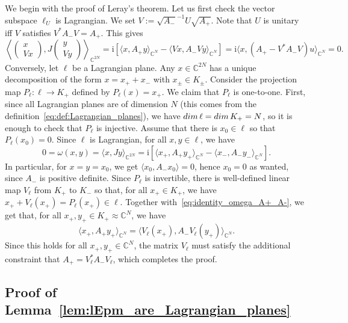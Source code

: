 \documentclass[11pt]{amsart}
\numberwithin{equation}{section} %
\newcommand\1{{\mathds 1}}
\def\C{{\mathbb C}}
\def\ri{{\mathrm{i}}}
\def\bra{\langle}
\def\ket{\rangle}
\def\dim{{\rm dim }}
\begin{document}
We begin with the proof of Leray's theorem. Let us first check the vector subspace $\ell_U$ is Lagrangian. We set $V := \sqrt{ A_-}^{-1} U \sqrt{A_+}$. Note that $U$ is unitary iff $V$ satisfies $V^* A_- V =  A_+$. This gives
    \[
    \left\bra \begin{pmatrix}
        x \\ V x
    \end{pmatrix}, J \begin{pmatrix}
        y \\ V y
    \end{pmatrix} \right\ket_{\C^{2N}} = \ri \left[ \bra x, A_+ y \ket_{\C^N} - \bra Vx, A_- Vy \ket_{\C^N} \right]
    = \ri \bra x, (A_+ - V^* A_- V) u \ket_{\C^N} = 0.
    \]
    Conversely, let $\ell$ be a Lagrangian plane. Any $x \in \C^{2N}$ has a unique decomposition of the form $x = x_+ + x_-$ with $x_\pm \in K_\pm$. Consider the projection map $P_\ell : \ell \to K_+$ defined by $P_\ell(x) = x_+$. We claim that $P_\ell$ is one-to-one. First, since all Lagrangian planes are of dimension $N$ (this comes from the definition~\eqref{eq:def:Lagrangian_planes}), we have $\dim \, \ell = \dim \, K_+ = N$, so it is enough to check that $P_\ell$ is injective. Assume that there is $x_0 \in \ell$ so that $P_\ell(x_0) = 0$. Since $\ell$ is Lagrangian, for all $x, y \in \ell$, we have
    \begin{equation} \label{eq:identity_omega_A+_A-}
        0 = \omega(x, y) = \bra x, J y \ket_{\C^{2N}} = \ri \left[ \bra x_+, A_+ y_+ \ket_{\C^N} - \bra x_-, A_- y_- \ket_{\C^N} \right].
    \end{equation}
    In particular, for $x = y = x_0$, we get $\bra x_0, A_- x_0 \ket = 0$, hence $x_0 = 0$ as wanted, since $A_-$ is positive definite. Since $P_\ell$ is invertible, there is well-defined linear map $V_\ell$ from $K_+$ to $K_-$ so that, for all $x_+ \in K_+$, we have $x_+ + V_\ell(x_+) = P_\ell(x_+) \in \ell$. Together with~\eqref{eq:identity_omega_A+_A-}, we get that, for all $x_+, y_+ \in K_+ \approx \C^N$, we have
    \[
    \bra x_+, A_+ y_+ \ket_{\C^N} = \bra V_\ell(x_+), A_- V_\ell(y_+) \ket_{\C^N}.
    \]
    Since this holds for all $x_+, y_+ \in \C^N$, the matrix $V_\ell$ must satisfy the additional constraint that $A_+ = V_\ell^* A_- V_\ell$, which completes the proof.




\subsection{Proof of Lemma~\ref{lem:lEpm_are_Lagrangian_planes}}
\label{app:proof:lagrangian_planes}
\end{document}
